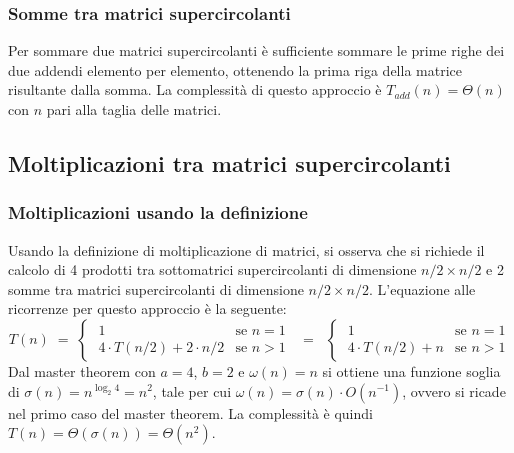 \subsubsection*{Somme tra matrici supercircolanti}
Per sommare due matrici supercircolanti è sufficiente sommare le prime righe dei due addendi elemento per elemento, ottenendo
la prima riga della matrice risultante dalla somma. La complessità di questo approccio è \(T_{add}(n) = \Theta(n)\) con \(n\)
pari alla taglia delle matrici.

\subsection{Moltiplicazioni tra matrici supercircolanti}
\subsubsection*{Moltiplicazioni usando la definizione}
Usando la definizione di moltiplicazione di matrici, si osserva che si richiede il calcolo di 4 prodotti tra sottomatrici
supercircolanti di dimensione \(n/2 \times n/2\) e 2 somme tra matrici supercircolanti di dimensione \(n/2 \times n/2\).
L'equazione alle ricorrenze per questo approccio è la seguente:
\[T(n) \; = \; \begin{cases}
	\; 1 & \text{se } n = 1 \\[3pt]
	\; 4 \cdot T(n/2) + 2 \cdot n/2 & \text{se } n > 1
\end{cases} \;\; = \;\; \begin{cases}
	\; 1 & \text{se } n = 1 \\[3pt]
	\; 4 \cdot T(n/2) + n & \text{se } n > 1
\end{cases}\]
Dal master theorem con \(a = 4\), \(b = 2\) e \(\omega(n) = n\) si ottiene una funzione soglia di
\(\sigma(n) = n^{\log_2 4} = n^2\), tale per cui \(\omega(n) = \sigma(n) \cdot O(n^{-1})\), ovvero si ricade
nel primo caso del master theorem. La complessità è quindi \(T(n) = \Theta(\sigma(n)) = \Theta(n^2)\).

\newpage

